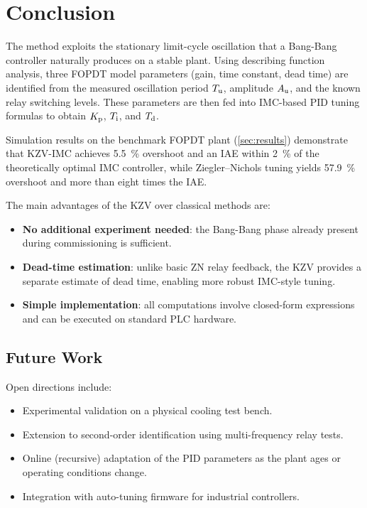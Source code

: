 \section{Conclusion}
\label{sec:conclusion}

The method exploits the stationary limit-cycle oscillation that a Bang-Bang
controller naturally produces on a stable plant.
Using describing function analysis, three FOPDT model parameters (gain,
time constant, dead time) are identified from the measured oscillation period
$T_{\mathrm{u}}$, amplitude $A_{\mathrm{u}}$, and the known relay switching levels.
These parameters are then fed into IMC-based PID tuning formulas to obtain
$K_{\mathrm{p}}$, $T_{\mathrm{i}}$, and $T_{\mathrm{d}}$.

Simulation results on the benchmark FOPDT plant (\cref{sec:results})
demonstrate that KZV-IMC achieves \SI{5.5}{\percent} overshoot and an IAE
within \SI{2}{\percent} of the theoretically optimal IMC controller, while
Ziegler--Nichols tuning yields \SI{57.9}{\percent} overshoot and more than
eight times the IAE.

The main advantages of the KZV over classical methods are:
\begin{itemize}
    \item \textbf{No additional experiment needed}: the Bang-Bang phase
          already present during commissioning is sufficient.
    \item \textbf{Dead-time estimation}: unlike basic ZN relay feedback,
          the KZV provides a separate estimate of dead time, enabling
          more robust IMC-style tuning.
    \item \textbf{Simple implementation}: all computations involve closed-form
          expressions and can be executed on standard PLC hardware.
\end{itemize}

\subsection*{Future Work}

Open directions include:
\begin{itemize}
    \item Experimental validation on a physical cooling test bench.
    \item Extension to second-order identification using multi-frequency
          relay tests.
    \item Online (recursive) adaptation of the PID parameters as the plant
          ages or operating conditions change.
    \item Integration with auto-tuning firmware for industrial controllers.
\end{itemize}
